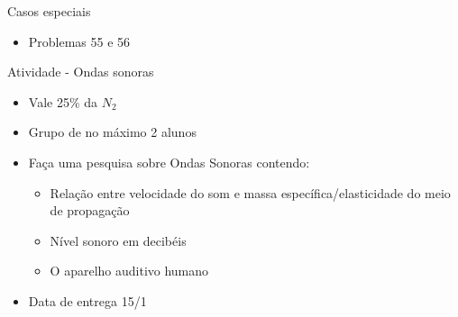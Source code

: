 \begin{frame}{Casos especiais}
    \begin{itemize}
        \item Problemas 55 e 56
    \end{itemize}
\end{frame}

\begin{frame}{Atividade - Ondas sonoras}
    \begin{itemize}
        \item Vale 25\% da \(N_2\)
        \item Grupo de no máximo 2 alunos
        \item Faça uma pesquisa sobre Ondas Sonoras contendo:
            \begin{itemize}
                \item Relação entre velocidade do som e massa específica/elasticidade do meio de propagação
                \item Nível sonoro em decibéis
                \item O aparelho auditivo humano
            \end{itemize}
        \item Data de entrega 15/1
    \end{itemize}
\end{frame}
